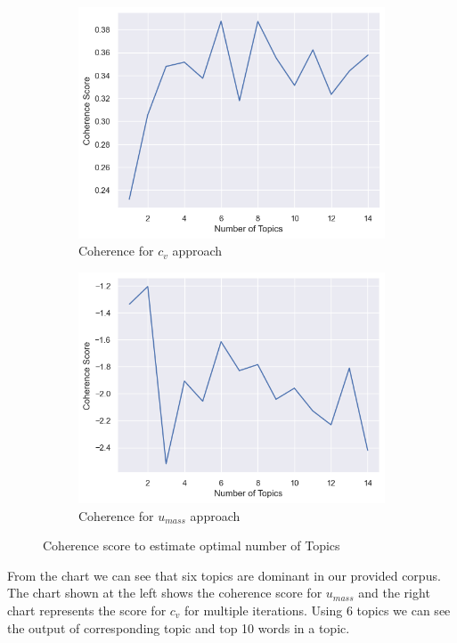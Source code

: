 \documentclass[sn-mathphys,Numbered]{sn-jnl}%
\theoremstyle{thmstyleone}%
\theoremstyle{thmstyletwo}%
\theoremstyle{thmstylethree}%
\begin{document}
\begin{figure}[h!] \centering \begin{subfigure}{0.45\textwidth}
 \includegraphics[width=\textwidth]{cv.png} \caption{Coherence for $c_v$ approach} 
 \end{subfigure}
  \hfill \begin{subfigure}{0.45\textwidth} 
 \includegraphics[width=\textwidth]{umass.png} \caption{Coherence for $u_{mass}$ approach} 
\end{subfigure} 
\caption{Coherence score to estimate optimal number of Topics} 
\label{cv_umass} 
\end{figure}

 From the chart we can see that six topics are dominant in our provided corpus. The chart shown at the left shows the coherence score for \(u_{mass}\) and the right chart represents the score for \(c_{v}\) for multiple iterations. Using 6 topics we can see the output of corresponding topic and top 10 words in a topic.
\end{document}
